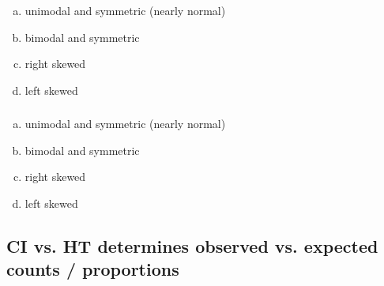 \documentclass[11pt,containsverbatim,handout,xcolor=xelatex,dvipsnames,table]{beamer}
\newcommand{\solnMult}[1]{#1}
\begin{document}

\begin{frame}
\frametitle{}


\begin{enumerate}[(a)]
\item unimodal and symmetric (nearly normal)
\item bimodal and symmetric
\item \solnMult{right skewed}
\item left skewed
\end{enumerate}

\end{frame}


\begin{frame}
\frametitle{}


\begin{enumerate}[(a)]
\item \solnMult{unimodal and symmetric (nearly normal)}
\item bimodal and symmetric
\item right skewed
\item left skewed
\end{enumerate}

\end{frame}


\subsection{CI vs. HT determines observed vs. expected counts / proportions}
\label{mi3}

\end{document}
